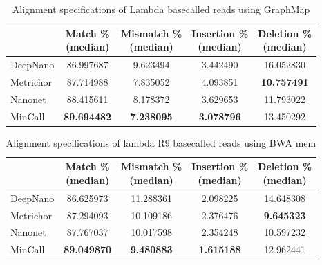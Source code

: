 \documentclass[runningheads,a4paper]{llncs}
\begin{document}
\begin{table}[]
	\caption{Alignment specifications of Lambda basecalled reads using GraphMap}
	\label{tbl:lambda_rates}
	\centering
	\begin{tabular}{lcccc}
		\toprule
		{} &  \thead{Match \% \\(median)} &  \thead{Mismatch \% \\(median)} &  \thead{Insertion \% \\(median)} &  \thead{Deletion \% \\(median)} \\
		\midrule
		DeepNano   &                  86.997687 &                      9.623494 &                       3.442490 &                     16.052830 \\
		Metrichor  &                  87.714988 &                      7.835052 &                       4.093851 &                     \textbf{10.757491} \\
		Nanonet    &                  88.415611 &                      8.178372 &                       3.629653 &                     11.793022 \\
		MinCall    &                 \textbf{ 89.694482} &                     \textbf{ 7.238095} &                       \textbf{3.078796} &                     13.450292 \\
		\bottomrule
	\end{tabular}

\end{table}
\begin{table}[]
	\caption{Alignment specifications of lambda R9 basecalled reads using BWA mem}
	\label{tbl:lambda_rates_bwa}
	\centering
	\begin{tabular}{lcccc}
		\toprule
		{} &  \thead{Match \% \\(median)} &  \thead{Mismatch \% \\(median)} &  \thead{Insertion \% \\(median)} &  \thead{Deletion \% \\(median)} \\
		\midrule

		DeepNano   &                  86.625973 &                     11.288361 &                       2.098225 &                     14.648308 \\
		Metrichor  &                  87.294093 &                     10.109186 &                       2.376476 &                      \textbf{9.645323 }\\
		Nanonet    &                  87.767037 &                     10.017598 &                       2.354248 &                     10.597232 \\
		MinCall    &                 \textbf{ 89.049870} &                     \textbf{ 9.480883} &                       \textbf{1.615188 }&                     12.962441 \\
		\bottomrule
	\end{tabular}
\end{table}
\end{document}
